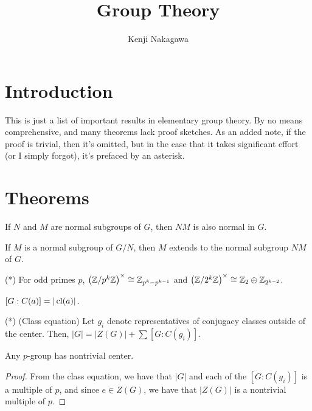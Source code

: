\documentclass{article}
\title{Group Theory}
\author{Kenji Nakagawa}
\begin{document}
\maketitle

\section*{Introduction}
This is just a list of important results in elementary group theory. By no means comprehensive, and many theorems lack proof sketches. As an added note, if the proof is trivial, then it's omitted, but in the case that it takes significant effort (or I simply forgot), it's prefaced by an asterisk.

\section{Theorems}

\begin{proposition}
If $N$ and $M$ are normal subgroups of $G$, then $NM$ is also normal in $G$.
\end{proposition}
\begin{corollary}
If $M$ is a normal subgroup of $G/N$, then $M$ extends to the normal subgroup $NM$ of $G$.
\end{corollary}

\begin{theorem}
(*) For odd primes $p$, $\left( \mathbb Z/p^k\mathbb Z \right)^\times \cong \mathbb Z_{p^k-p^{k-1}}$ and $\left(\mathbb Z/2^k\mathbb Z\right)^\times \cong \mathbb Z_2 \oplus \mathbb Z_{2^{k-2}}$.
\end{theorem}

\begin{proposition}
$[G:C(a)] = |\operatorname{cl}(a)|$.
\end{proposition}

\begin{theorem}
(*) (Class equation) Let $g_i$ denote representatives of conjugacy classes outside of the center. Then, $|G| = |Z(G)|+ \sum [G:C(g_i)].$
\end{theorem}

\begin{corollary}
Any $p$-group has nontrivial center.
\end{corollary}
\begin{proof}
    From the class equation, we have that $|G|$ and each of the $[G:C(g_i)]$ is a multiple of $p$, and since $e \in Z(G)$, we have that $|Z(G)|$ is a nontrivial multiple of $p$.
\end{proof}
\end{document}
